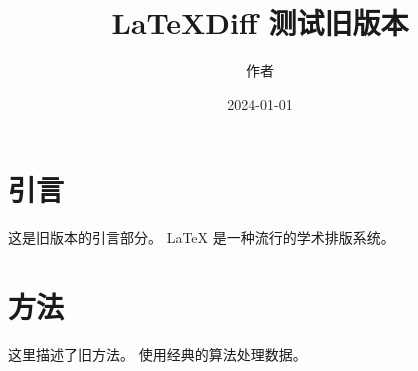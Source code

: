 \documentclass{article}
\title{LaTeXDiff 测试旧版本}
\author{作者}
\date{2024-01-01}
\begin{document}
\maketitle

\section{引言}

这是旧版本的引言部分。
LaTeX 是一种流行的学术排版系统。

\section{方法}

这里描述了旧方法。
使用经典的算法处理数据。
\end{document}
